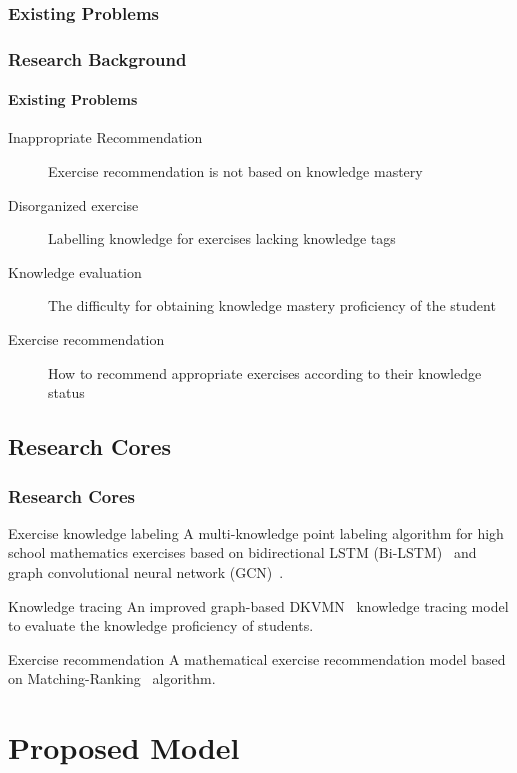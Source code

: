 \documentclass{beamer}
\begin{document}
\subsubsection{Existing Problems}
\begin{frame}
  \frametitle{Research Background}
  \framesubtitle{Existing Problems}
  \begin{description}
    \item[Inappropriate Recommendation] Exercise recommendation is not based on knowledge mastery
    \item[Disorganized exercise] Labelling knowledge for exercises lacking knowledge tags
    \item[Knowledge evaluation] The difficulty for obtaining knowledge mastery proficiency of the student
    \item[Exercise recommendation] How to recommend appropriate exercises according to their knowledge status
  \end{description}
\end{frame}
\subsection{Research Cores}
\begin{frame}
  \frametitle{Research Cores}
  \begin{block}{Exercise knowledge labeling}
    A multi-knowledge point labeling algorithm for high school mathematics exercises based on bidirectional LSTM (Bi-LSTM)~\cite{chen2017improving} and graph convolutional neural network (GCN)~\cite{kipf2016semi}.
  \end{block}
  \begin{block}{Knowledge tracing}
    An improved graph-based DKVMN~\cite{zhang2017dynamic} knowledge tracing model to evaluate the knowledge proficiency of students.
  \end{block}
  \begin{block}{Exercise recommendation}
    A mathematical exercise recommendation model based on Matching-Ranking~\cite{segev2009context} algorithm.
  \end{block}
\end{frame}
\section{Proposed Model}
\end{document}
